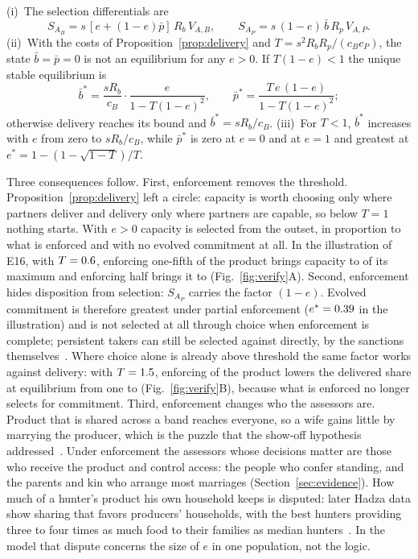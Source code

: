 \begin{proposition}\label{prop:enforce}
(i)~The selection differentials are
\begin{equation}
S_{A_B}=s\,[e+(1-e)\bar p]\,R_b\,V_{A,B},\qquad S_{A_P}=s\,(1-e)\,\bar b\,R_p\,V_{A,P}.\label{eq:enforce}
\end{equation}
(ii)~With the costs of Proposition~\ref{prop:delivery} and $T=s^2R_bR_p/(c_Bc_P)$, the state $\bar b=\bar p=0$ is not an
equilibrium for any $e>0$. If $T(1-e)<1$ the unique stable equilibrium is
\begin{equation}
\bar b^*=\frac{sR_b}{c_B}\cdot\frac{e}{1-T(1-e)^2},\qquad \bar p^*=\frac{T\,e\,(1-e)}{1-T(1-e)^2};\label{eq:enforceeq}
\end{equation}
otherwise delivery reaches its bound and $\bar b^*=sR_b/c_B$. (iii)~For $T<1$, $\bar b^*$ increases with $e$ from zero to
$sR_b/c_B$, while $\bar p^*$ is zero at $e=0$ and at $e=1$ and greatest at $e^*=1-(1-\sqrt{1-T})/T$.
\end{proposition}

Three consequences follow. First, enforcement removes the threshold. Proposition~\ref{prop:delivery} left a circle:
capacity is worth choosing only where partners deliver and delivery only where partners are capable, so below $T=1$ nothing
starts. With $e>0$ capacity is selected from the outset, in proportion to what is enforced and with no evolved commitment
at all. In the illustration of E16, with $T=0.6$, enforcing one-fifth of the product brings capacity to \EnfCapFifth{} of
its maximum and enforcing half brings it to \EnfCapHalf{} (Fig.~\ref{fig:verify}A). Second, enforcement hides disposition
from selection: $S_{A_P}$ carries the factor $(1-e)$. Evolved commitment is therefore greatest under partial enforcement
($e^*=0.39$ in the illustration) and is not selected at all through choice when enforcement is complete; persistent
takers can still be selected against directly, by the sanctions themselves~\cite{wrangham2019}. Where choice alone is
already above threshold the same factor works against delivery: with $T=1.5$, enforcing \EnfCrowdAt{} of the product
lowers the delivered share at equilibrium from one to \EnfCrowdMin{} (Fig.~\ref{fig:verify}B), because what is enforced no
longer selects for commitment. Third, enforcement changes
who the assessors are. Product that is shared across a band reaches everyone, so a wife gains little by marrying the
producer, which is the puzzle that the show-off hypothesis addressed~\cite{hawkes2002}. Under enforcement the assessors
whose decisions matter are those who receive the product and control access: the people who confer standing, and the
parents and kin who arrange most marriages (Section~\ref{sec:evidence}). How much of a hunter's product his own household
keeps is disputed: later Hadza data show sharing that favors producers' households, with the best hunters providing three
to four times as much food to their families as median hunters~\cite{wood2013,gurvenhill2009}. In the model that dispute
concerns the size of $e$ in one population, not the logic.

